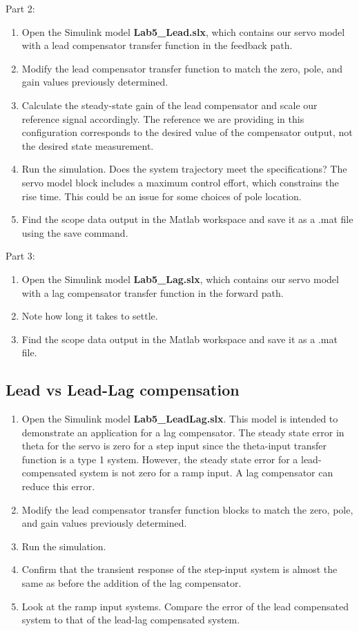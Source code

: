 \documentclass[11pt,a4paper]{article}
\begin{document}
Part 2:
\begin{enumerate}
\item Open the Simulink model \textbf{Lab5\_Lead.slx}, which contains our servo model with a lead compensator transfer function in the feedback path.
\item Modify the lead compensator transfer function to match the zero, pole, and gain values previously determined. 
\item Calculate the steady-state gain of the lead compensator and scale our reference signal accordingly. The reference we are providing in this configuration corresponds to the desired value of the compensator output, not the desired state measurement.
\item Run the simulation. Does the system trajectory meet the specifications? The servo model block includes a maximum control effort, which constrains the rise time. This could be an issue for some choices of pole location.
\item Find the scope data output in the Matlab workspace and save it as a .mat file using the save command.
\end{enumerate}

Part 3:
\begin{enumerate}
\item Open the Simulink model \textbf{Lab5\_Lag.slx}, which contains our servo model with a lag compensator transfer function in the forward path.
\item Note how long it takes to settle.
\item Find the scope data output in the Matlab workspace and save it as a .mat file.
\end{enumerate}

\subsection{Lead vs Lead-Lag compensation}
\begin{enumerate}
\item Open the Simulink model \textbf{Lab5\_LeadLag.slx}. This model is intended to demonstrate an application for a lag compensator. The steady state error in theta for the servo is zero for a step input since the theta-input transfer function is a type 1 system. However, the steady state error for a lead-compensated system is not zero for a ramp input. A lag compensator can reduce this error. 
\item Modify the lead compensator transfer function blocks to match the zero, pole, and gain values previously determined.
\item Run the simulation.
\item Confirm that the transient response of the step-input system is almost the same as before the addition of the lag compensator.
\item Look at the ramp input systems. Compare the error of the lead compensated system to that of the lead-lag compensated system.
\end{enumerate}
\end{document}
